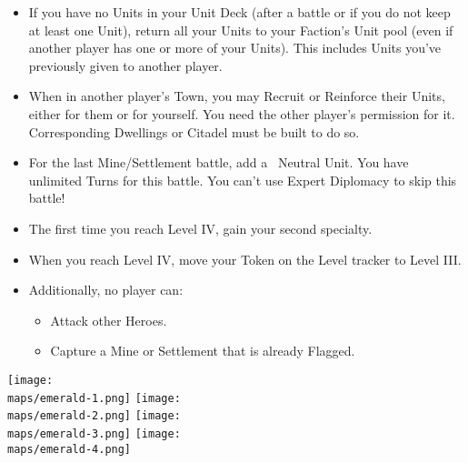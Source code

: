 \begin{multicols*}{2}
\begin{itemize}
    \item If you have no Units in your Unit Deck (after a battle or if you do not keep at least one Unit), return all your Units to your Faction's Unit pool (even if another player has one or more of your Units). This includes Units you've previously given to another player.

    \item When in another player's Town, you may Recruit or Reinforce their Units, either for them or for yourself. You need the other player's permission for it. Corresponding Dwellings or Citadel must be built to do so.

    \item For the last Mine/Settlement battle, add a \golden\ Neutral Unit. You have unlimited Turns for this battle. You can't use Expert Diplomacy to skip this battle!

    \item The first time you reach Level IV, gain your second specialty.

    \item When you reach Level IV, move your Token on the Level tracker to Level III.

    \item Additionally, no player can:
    \begin{itemize}
        \item Attack other Heroes.
        \item Capture a Mine or Settlement that is already Flagged.
    \end{itemize}
\end{itemize}

\vspace{2em}

\begin{center}
  \texttt{[image: \\maps/emerald-1.png]}
  \vspace{3em}
  \texttt{[image: \\maps/emerald-2.png]}
  \vspace{3em}
  \texttt{[image: \\maps/emerald-3.png]}
  \vspace{3em}
  \texttt{[image: \\maps/emerald-4.png]}
\end{center}

\end{multicols*}
